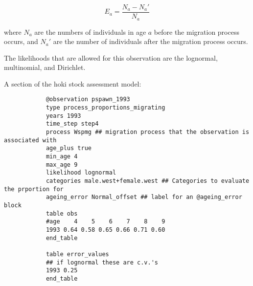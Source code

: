 \begin{itemize}
	\begin{equation}
	E_a = \frac{N_a - N_a'}{N_a}
	\end{equation}
	
	where $N_a$ are the numbers of individuals in age $a$ before the migration process occurs, and $N_a'$ are the number of individuals after the migration process occurs.
	
	The likelihoods that are allowed for this observation are the lognormal, multinomial, and Dirichlet.
	
	A section of the hoki stock assessment model:
	
	{\small{\begin{verbatim}
			@observation pspawn_1993
			type process_proportions_migrating
			years 1993
			time_step step4
			process Wspmg ## migration process that the observation is associated with
			age_plus true
			min_age 4
			max_age 9
			likelihood lognormal
			categories male.west+female.west ## Categories to evaluate the prportion for
			ageing_error Normal_offset ## label for an @ageing_error block
			table obs
			#age    4    5    6    7    8    9
			1993 0.64 0.58 0.65 0.66 0.71 0.60
			end_table
			
			table error_values
			## if lognormal these are c.v.'s
			1993 0.25
			end_table
			\end{verbatim}}}
	
\end{itemize}
\else
